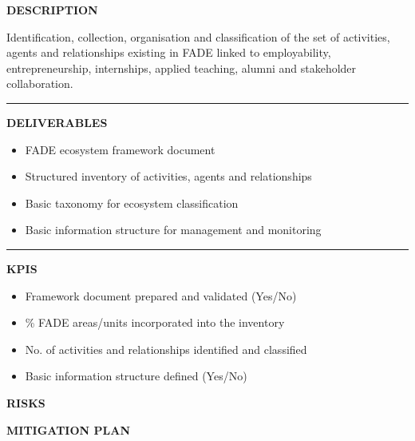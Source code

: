 \documentclass[11pt,a4paper]{scrreprt}
\newcommand{\fieldlabel}[1]{%
  {\footnotesize\sffamily\bfseries\color{mutedcolor}\MakeUppercase{#1}}\par\nopagebreak[4]
}
\newcommand{\fieldsep}{\vspace{3pt}\noindent\textcolor{bordercolor}{\rule{\linewidth}{0.4pt}}\vspace{3pt}\par}
\begin{document}
\begin{tcolorbox}[pabox={filcolor}{A.P.1.1 \enspace\textbullet\enspace Mapping, Inventory and Classification of the FADE Ecosystem}]

\fieldlabel{Description}
{\small Identification, collection, organisation and classification of the set of activities, agents and relationships existing in FADE linked to employability, entrepreneurship, internships, applied teaching, alumni and stakeholder collaboration.}\par
\fieldsep
\fieldlabel{Deliverables}
{\small \begin{itemize}[noitemsep,topsep=2pt]
\item FADE ecosystem framework document
\item Structured inventory of activities, agents and relationships
\item Basic taxonomy for ecosystem classification
\item Basic information structure for management and monitoring
\end{itemize}}\par
\fieldsep
\fieldlabel{KPIs}
{\small \begin{itemize}[noitemsep,topsep=2pt]
\item Framework document prepared and validated (Yes/No)
\item \% FADE areas/units incorporated into the inventory
\item No. of activities and relationships identified and classified
\item Basic information structure defined (Yes/No)
\end{itemize}}\par
\end{tcolorbox}
\begin{tcolorbox}[riskbox]
{\footnotesize\sffamily\bfseries\color{red!50!black} RISKS}\par{}
\end{tcolorbox}
\begin{tcolorbox}[mitbox]
{\footnotesize\sffamily\bfseries\color{green!40!black} MITIGATION PLAN}\par{}
\end{tcolorbox}
\end{document}
